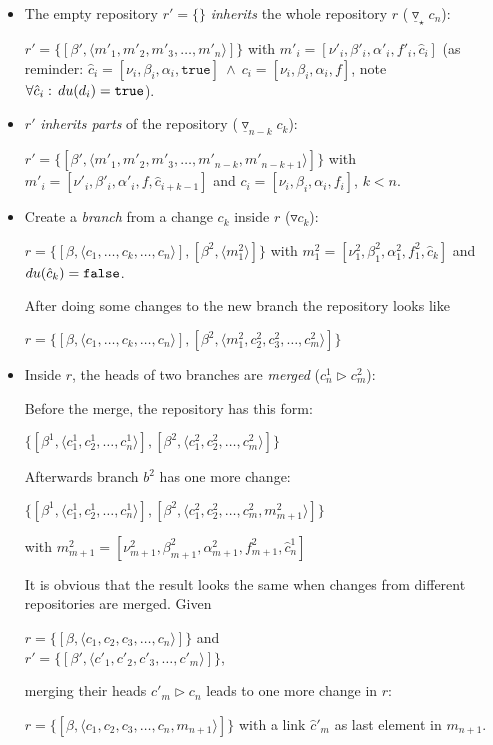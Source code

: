 \documentclass[fleqn, 10pt, a4paper]{report}
\begin{document}
\begin{itemize}
\item The empty repository $r'=\{\}$ \emph{inherits} the whole repository $r$
($\underline\triangledown_\star c_n$):

$r' = \{[\beta', \langle m'_1, m'_2, m'_3, \ldots, m'_n\rangle]\}$ with
$m'_i = [\nu'_i, \beta'_i, \alpha'_i, f'_i, \hat c_i]$ (as reminder:
$\hat c_i = [\nu_i, \beta_i, \alpha_i, \mathtt{true}]\
\wedge\ c_i=[\nu_i, \beta_i, \alpha_i, f]$, note $\forall
\hat c_i:\, \mathnormal{du}(d_i)=\mathtt{true}$).

\item $r'$ \emph{inherits parts} of the repository ($\underline\triangledown_
{n-k}c_k$):

$r'=\{[\beta', \langle m'_1, m'_2, m'_3, \ldots, m'_{n-k}, m'_{n-k+1}\rangle]\}$ with
$m'_i=[\nu'_i, \beta'_i, \alpha'_i, f, \hat c_{i+k-1}]$ and
$c_{i}=[\nu_i, \beta_i, \alpha_i, f_i]$, $k<n$.

\item Create a \emph{branch} from a change $c_k$ inside $r$
($\triangledown c_k$):

$r = \{[\beta, \langle c_1, \ldots, c_k, \ldots, c_n\rangle], [\beta^2, \langle m_1^2
\rangle]\}$ with $m_1^2=[\nu_1^2, \beta_1^2, \alpha_1^2, f_1^2, \hat c_k]$ and
$\mathnormal{du}(\hat c_k)=\mathtt{false}$.	

After doing some changes to the new branch the repository looks like

$r = \{[\beta, \langle c_1, \ldots, c_k, \ldots, c_n\rangle], [\beta^2, \langle m_1^2,
c_2^2, c_3^2, \ldots, c_m^2\rangle ]\}$

\item Inside $r$, the heads of two branches are \emph{merged}
($c_n^1 \rhd
 c_m^2$):

Before the merge, the repository has this form:

$\{[\beta^1, \langle c_1^1, c_2^1, \ldots, c_n^1\rangle],
[\beta^2, \langle c_1^2, c_2^2, \ldots, c_m^2\rangle]\}$	

Afterwards branch $b^2$ has one more change:

$\{[\beta^1, \langle c_1^1, c_2^1, \ldots, c_n^1\rangle],
[\beta^2, \langle c_1^2, c_2^2, \ldots, c_m^2, m_{m+1}^2\rangle]\}$

with $m_{m+1}^2=[\nu_{m+1}^2, \beta_{m+1}^2, \alpha_{m+1}^2, f_{m+1}^2,
\hat c_n^1]$

It is obvious that the result looks the same when changes
from different repositories are merged. Given

$r = \{[\beta, \langle c_1, c_2, c_3, \ldots, c_n\rangle]\}$ and \\
$r' = \{[\beta', \langle c'_1, c'_2, c'_3, \ldots, c'_m\rangle]\}$,

merging their heads $c'_m \rhd c_n$ leads to one more change in
$r$:

$r = \{[\beta, \langle c_1, c_2, c_3, \ldots, c_n, m_{n+1}\rangle]\}$
with a link $\hat c'_m$ as last element in $m_{n+1}$.
\end{itemize}
\end{document}
